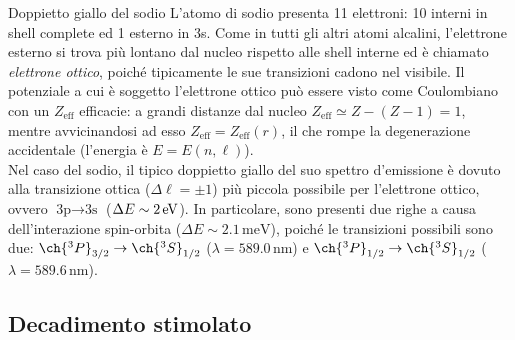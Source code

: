 \begin{example}{Doppietto giallo del sodio}{}
	L'atomo di sodio presenta 11 elettroni: 10 interni in shell complete ed 1 esterno in 3s. Come in tutti gli altri atomi alcalini, l'elettrone esterno si trova più lontano dal nucleo rispetto alle shell interne ed è chiamato \textit{elettrone ottico}, poiché tipicamente le sue transizioni cadono nel visibile. Il potenziale a cui è soggetto l'elettrone ottico può essere visto come Coulombiano con un $ Z_\text{eff} $ efficacie: a grandi distanze dal nucleo $ Z_\text{eff} \simeq Z - (Z-1) = 1 $, mentre avvicinandosi ad esso $ Z_\text{eff} = Z_\text{eff}(r) $, il che rompe la degenerazione accidentale (l'energia è $ E = E(n,\ell) $). \\
	Nel caso del sodio, il tipico doppietto giallo del suo spettro d'emissione è dovuto alla transizione ottica ($ \Delta \ell = \pm 1 $) più piccola possibile per l'elettrone ottico, ovvero $ \text{3p} \rightarrow \text{3s} $ ($ \Delta E \sim 2\,\mathrm{eV} $). In particolare, sono presenti due righe a causa dell'interazione spin-orbita ($ \Delta E \sim 2.1 \,\text{meV} $), poiché le transizioni possibili sono due: $ \ch{^3P}_{3/2} \rightarrow \ch{^3S}_{1/2} $ ($ \lambda = 589.0 \,\text{nm} $) e $ \ch{^3P}_{1/2} \rightarrow \ch{^3S}_{1/2} $ ($ \lambda = 589.6 \,\text{nm} $).
\end{example}

\subsection{Decadimento stimolato}

